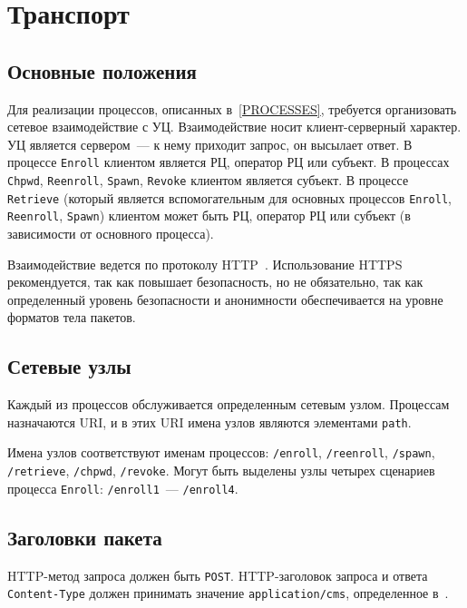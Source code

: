 \chapter{Транспорт}\label{TRANSPORT}

\section{Основные положения}\label{TRANSPORT.Common}

Для реализации процессов, описанных в~\ref{PROCESSES}, требуется
организовать сетевое взаимодействие с УЦ. Взаимодействие носит
клиент-серверный характер. УЦ является сервером~--- к нему приходит запрос,
он высылает ответ. В процессе  \texttt{Enroll} клиентом является РЦ,
оператор РЦ или субъект. В процессах \texttt{Chpwd}, \texttt{Reenroll},
\texttt{Spawn}, \texttt{Revoke} клиентом является субъект. В процессе
\texttt{Retrieve} (который является вспомогательным для основных процессов
\texttt{Enroll}, \texttt{Reenroll}, \texttt{Spawn}) клиентом может быть РЦ,
оператор РЦ или субъект (в зависимости от основного процесса).

Взаимодействие ведется по протоколу HTTP~\cite{HTTP}.
Использование HTTPS рекомендуется, так как повышает безопасность,
но не обязательно, так как определенный уровень безопасности и анонимности
обеспечивается на уровне форматов тела пакетов.

\section{Сетевые узлы}\label{TRANSPORT.Endpoints}

Каждый из процессов обслуживается определенным сетевым узлом.
Процессам назначаются URI, и в этих URI имена узлов являются
элементами \texttt{path}.

Имена узлов соответствуют именам процессов: 
\texttt{/enroll},
\texttt{/reenroll},
\texttt{/spawn},
\texttt{/retrieve},
\texttt{/chpwd},
\texttt{/revoke}.
%
Могут быть выделены узлы четырех сценариев процесса \texttt{Enroll}:
\texttt{/enroll1}~--- \texttt{/enroll4}.

\section{Заголовки пакета}\label{TRANSPORT.Headers}

HTTP-метод запроса должен быть \texttt{POST}.
HTTP-заголовок запроса и ответа \texttt{Content-Type} должен принимать
значение \texttt{application/cms}, определенное в~\cite{ContentTypeCms}. 

